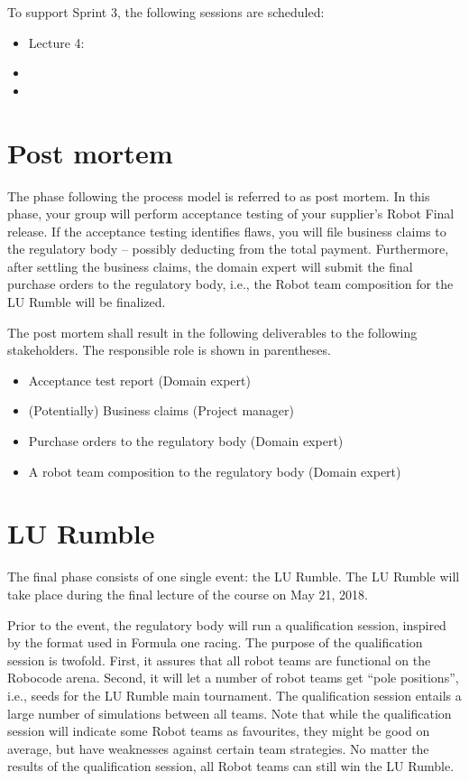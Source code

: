 \documentclass{scrreprt}
\begin{document}
To support Sprint 3, the following sessions are scheduled:
\begin{itemize}
\item Lecture 4:
\item 
\item 
\end{itemize}

\section{Post mortem}
The phase following the process model is referred to as post mortem. In this phase, your group will perform acceptance testing of your supplier's Robot Final release. If the acceptance testing identifies flaws, you will file business claims to the regulatory body -- possibly deducting from the total payment. Furthermore, after settling the business claims, the domain expert will submit the final purchase orders to the regulatory body, i.e., the Robot team composition for the LU Rumble will be finalized.

The post mortem shall result in the following deliverables to the following stakeholders. The responsible role is shown in parentheses.
\begin{itemize}
\item Acceptance test report (Domain expert)
\item (Potentially) Business claims (Project manager)
\item Purchase orders to the regulatory body (Domain expert)
\item A robot team composition to the regulatory body (Domain expert)
\end{itemize}

\section{LU Rumble}
The final phase consists of one single event: the LU Rumble. The LU Rumble will take place during the final lecture of the course on May 21, 2018.

Prior to the event, the regulatory body will run a qualification session, inspired by the format used in Formula one racing. The purpose of the qualification session is twofold. First, it assures that all robot teams are functional on the Robocode arena. Second, it will let a number of robot teams get ``pole positions'', i.e., seeds for the LU Rumble main tournament. The qualification session entails a large number of simulations between all teams. Note that while the qualification session will indicate some Robot teams as favourites, they might be good on average, but have weaknesses against certain team strategies. No matter the results of the qualification session, all Robot teams can still win the LU Rumble.  
\end{document}
